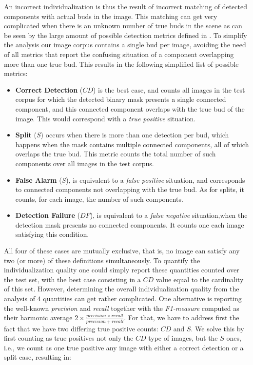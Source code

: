 \documentclass[a4paper,authoryear,review]{elsarticle}
\begin{document}
%
An incorrect individualization is thus the result of incorrect matching of detected components with actual buds in the image. This matching can get very complicated when there is an unknown number of true buds in the scene as can be seen by the large amount of possible detection metrics defined in \cite{oguz2017dice}. To simplify the analysis our image corpus contains a single bud per image, avoiding the need of all metrics that report the confusing situation of a component overlapping more than one true bud. This results in the following simplified list of possible metrics:

\begin{itemize}
	\item \textbf{Correct Detection} ($CD$) is the best case, and counts all images in the test corpus for which the detected binary mask presents a single connected component, and this connected component overlaps with the true bud of the image. This would correspond with a \emph{true positive} situation.
	\item \textbf{Split} ($S$) occurs when there is more than one detection per bud, which happens  when the mask contains multiple connected components, all of which overlaps the true bud. This metric counts the total number of such components over all images in the test corpus.
	\item \textbf{False Alarm} ($S$), is equivalent to a \emph{false positive} situation, and corresponds to connected components not overlapping with the true bud. As for splits, it counts, for each image, the number of such components.
	\item \textbf{Detection Failure} ($DF$), is equivalent to a \emph{false negative} situation,when the detection mask presents no connected components. It counts one each image satisfying this condition.
\end{itemize}

All four of these cases are mutually exclusive, that is, no image can satisfy any two (or more) of these definitions simultaneously. To quantify the individualization quality one could simply report these quantities counted over the test set, with the best case consisting in a $CD$ value equal to the cardinality of this set. However, determining the overall individualization quality from the analysis of $4$ quantities can get rather complicated. 
%
One alternative is reporting the well-known \emph{precision} and \emph{recall} together with the \emph{F1-measure} computed as their harmonic average \( 2 \times \frac{precision \times recall}{precision + recall}\). For that, we have to address first the fact that  we have two differing true positive counts: $CD$ and $S$. We solve this by first counting as true positives not only the $CD$ type of images, but the $S$ ones, i.e., we count as one true positive any image with either a correct detection or a split case, resulting in:
\end{document}
